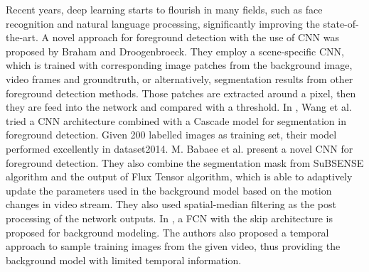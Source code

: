 \documentclass[journal]{IEEEtran}
\begin{document}
%
Recent years, deep learning starts to flourish in many fields, such as face recognition and natural language processing, significantly improving the state-of-the-art. A novel approach for foreground detection with the use of CNN was proposed by Braham and Droogenbroeck\cite{Braham2016deep}. They employ a scene-specific CNN, which is trained with corresponding image patches from the background image, video frames and groundtruth, or alternatively, segmentation results from other foreground detection methods. Those patches are extracted around a pixel, then they are feed into the network and compared with a threshold.
%
In \cite{wang2016PRL}, Wang et al. tried a CNN architecture combined with a Cascade model for segmentation in foreground detection. Given 200 labelled images as training set, their model performed excellently in dataset2014.
%
M. Babaee et al. \cite{Babaee2017deep} present a novel CNN for foreground detection. They also combine the segmentation mask from SuBSENSE\cite{St-Charles2015SuBSENSE} algorithm and the output of Flux Tensor algorithm, which is able to adaptively update the parameters used in the background model based on the motion changes in video stream. They also used spatial-median filtering as the post processing of the network outputs.
In \cite{Yang2018DBMF}, a FCN with the skip architecture is proposed for background modeling. 
The authors also proposed a temporal approach to sample training images from the given video, thus providing the background model with limited temporal information. 
\end{document}

